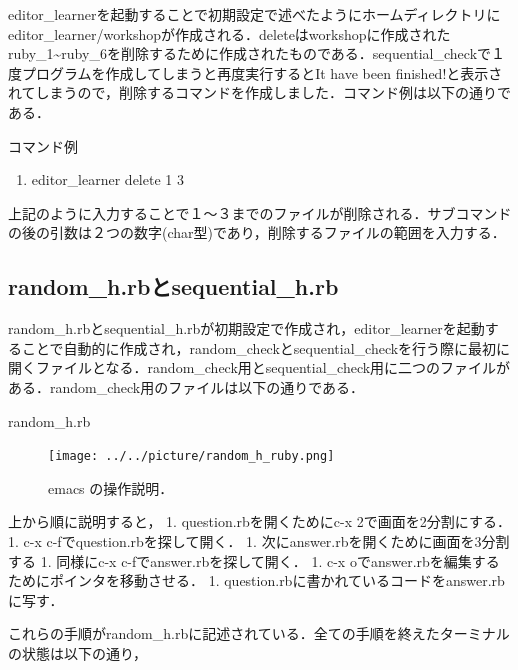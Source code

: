 \documentclass[11pt,dvipdfmx]{jsarticle}
\providecommand{\tightlist}{%
      \setlength{\itemsep}{0pt}\setlength{\parskip}{0pt}}
\begin{document}
    editor\_learnerを起動することで初期設定で述べたようにホームディレクトリにeditor\_learner/workshopが作成される．deleteはworkshopに作成されたruby\_1\textasciitilde{}ruby\_6を削除するために作成されたものである．sequential\_checkで１度プログラムを作成してしまうと再度実行するとIt
have been
finished!と表示されてしまうので，削除するコマンドを作成しました．コマンド例は以下の通りである．

コマンド例

\begin{enumerate}
\def\labelenumi{\arabic{enumi}.}
\tightlist
\item
  editor\_learner delete 1 3
\end{enumerate}

上記のように入力することで１〜３までのファイルが削除される．サブコマンドの後の引数は２つの数字(char型)であり，削除するファイルの範囲を入力する．

    \subsection{random\_h.rbとsequential\_h.rb}\label{random_h.rbux3068sequential_h.rb}

random\_h.rbとsequential\_h.rbが初期設定で作成され，editor\_learnerを起動することで自動的に作成され，random\_checkとsequential\_checkを行う際に最初に開くファイルとなる．random\_check用とsequential\_check用に二つのファイルがある．random\_check用のファイルは以下の通りである．

random\_h.rb

\begin{figure}[H]
\centering
\begin{center}
\texttt{[image: ../../picture/random\_h\_ruby.png]}
\end{center}
\caption{emacs の操作説明．\label{random_h}}

\label{fig:}
\end{figure}

上から順に説明すると， 1. question.rbを開くためにc-x
2で画面を2分割にする． 1. c-x c-fでquestion.rbを探して開く． 1.
次にanswer.rbを開くために画面を3分割する 1. 同様にc-x
c-fでanswer.rbを探して開く． 1. c-x
oでanswer.rbを編集するためにポインタを移動させる． 1.
question.rbに書かれているコードをanswer.rbに写す．

これらの手順がrandom\_h.rbに記述されている．全ての手順を終えたターミナルの状態は以下の通り，
\end{document}
